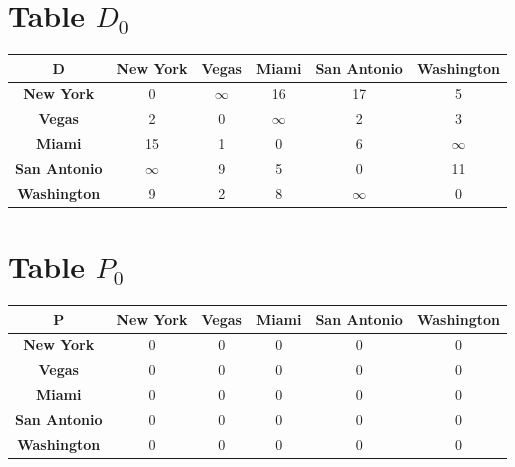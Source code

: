 \documentclass{article}
\begin{document}
\section{Table $D_{0}$}
\begin{center}
    \begin{tabular}{|c||c|c|c|c|c|}
        \hline
        \textbf{D} & \textbf{New York} & \textbf{Vegas} & \textbf{Miami} & \textbf{San Antonio} & \textbf{Washington} \\
        \hline
        \hline
        \textbf{New York}& 0 & $\infty$ & 16 & 17 & 5 \\
        \hline
        \textbf{Vegas}& 2 & 0 & $\infty$ & 2 & 3 \\
        \hline
        \textbf{Miami}& 15 & 1 & 0 & 6 & $\infty$ \\
        \hline
        \textbf{San Antonio}& $\infty$ & 9 & 5 & 0 & 11 \\
        \hline
        \textbf{Washington}& 9 & 2 & 8 & $\infty$ & 0 \\
        \hline
    \end{tabular}
\end{center}


\section{Table $P_{0}$}
\begin{center}
    \begin{tabular}{|c||c|c|c|c|c|}
        \hline
        \textbf{P} & \textbf{New York} & \textbf{Vegas} & \textbf{Miami} & \textbf{San Antonio} & \textbf{Washington} \\
        \hline
        \hline
        \textbf{New York}& 0 & 0 & 0 & 0 & 0 \\
        \hline
        \textbf{Vegas}& 0 & 0 & 0 & 0 & 0 \\
        \hline
        \textbf{Miami}& 0 & 0 & 0 & 0 & 0 \\
        \hline
        \textbf{San Antonio}& 0 & 0 & 0 & 0 & 0 \\
        \hline
        \textbf{Washington}& 0 & 0 & 0 & 0 & 0 \\
        \hline
    \end{tabular}
\end{center}
\end{document}
